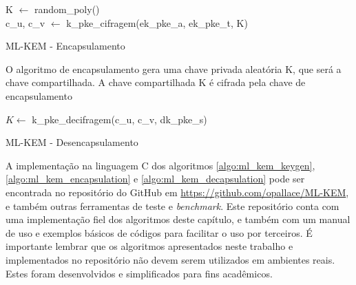         \begin{algorithm}[!htbp]
            \SetAlgoLined
       
            K $\leftarrow$ random\_poly()\\
            c\_u, c\_v $\leftarrow$ k\_pke\_cifragem(ek\_pke\_a, ek\_pke\_t, K)

            
            \caption{ML-KEM - Encapsulamento}
            \label{algo:ml_kem_encapsulation}
        \end{algorithm}

        O algoritmo de encapsulamento gera uma chave privada aleatória K, que será a chave compartilhada. A chave compartilhada K é cifrada pela chave de encapsulamento
        
        \begin{algorithm}[!htbp]
            \SetAlgoLined
            
            $K \leftarrow$ k\_pke\_decifragem(c\_u, c\_v, dk\_pke\_s)
            
        
            \caption{ML-KEM - Desencapsulamento}
            \label{algo:ml_kem_decapsulation}
        \end{algorithm}

        A implementação na linguagem C dos algoritmos \ref{algo:ml_kem_keygen}, \ref{algo:ml_kem_encapsulation} e \ref{algo:ml_kem_decapsulation} pode ser encontrada no repositório do GitHub em \url{https://github.com/opallace/ML-KEM}, e também outras ferramentas de teste e \textit{benchmark}. Este repositório conta com uma implementação fiel dos algoritmos deste capítulo, e também com um manual de uso e exemplos básicos de códigos para facilitar o uso por terceiros. É importante lembrar que os algoritmos apresentados neste trabalho e implementados no repositório não devem serem utilizados em ambientes reais. Estes foram desenvolvidos e simplificados para fins acadêmicos. 

